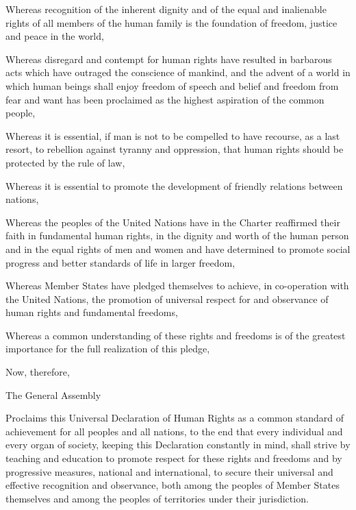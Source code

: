 \documentclass[a5paper]{article}
\begin{document}
\UseParaDefault
{}
%
\begin{para}Whereas recognition of the inherent dignity and of the equal and inalienable rights of all members of the human family is the foundation of freedom, justice and peace in the world,\end{para}
\begin{para}Whereas disregard and contempt for human rights have resulted in barbarous acts which have outraged the conscience of mankind, and the advent of a world in which human beings shall enjoy freedom of speech and belief and freedom from fear and want has been proclaimed as the highest aspiration of the common people,\end{para}
\begin{para}Whereas it is essential, if man is not to be compelled to have recourse, as a last resort, to rebellion against tyranny and oppression, that human rights should be protected by the rule of law,\end{para}
\begin{para}Whereas it is essential to promote the development of friendly relations between nations,\end{para}
\begin{para}Whereas the peoples of the United Nations have in the Charter reaffirmed their faith in fundamental human rights, in the dignity and worth of the human person and in the equal rights of men and women and have determined to promote social progress and better standards of life in larger freedom,\end{para}
\begin{para}Whereas Member States have pledged themselves to achieve, in co-operation with the United Nations, the promotion of universal respect for and observance of human rights and fundamental freedoms,\end{para}
\begin{para}Whereas a common understanding of these rights and freedoms is of the greatest importance for the full realization of this pledge,\end{para}
\begin{para}Now, therefore,\end{para}
\begin{para}The General Assembly\end{para}
\begin{para}Proclaims this Universal Declaration of Human Rights as a common standard of achievement for all peoples and all nations, to the end that every individual and every organ of society, keeping this Declaration constantly in mind, shall strive by teaching and education to promote respect for these rights and freedoms and by progressive measures, national and international, to secure their universal and effective recognition and observance, both among the peoples of Member States themselves and among the peoples of territories under their jurisdiction.\end{para}
\end{document}

